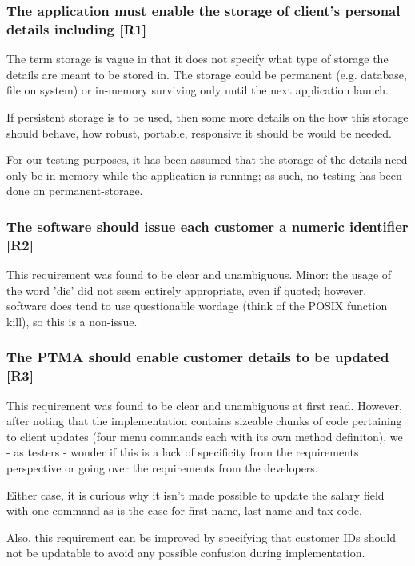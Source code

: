 \subsubsection{The application must enable the storage of client’s personal details including [R1]}
The term storage is vague in that it does not specify what type of storage the details are meant to be stored in. The storage could be permanent (e.g. database, file on system) or in-memory surviving only until the next application launch. 
\par
If persistent storage is to be used, then some more details on the how this storage should behave, how robust, portable, responsive it should be would be needed. 
\par
For our testing purposes, it has been assumed that the storage of the details need only be in-memory while the application is running; as such, no testing has been done on permanent-storage.

\subsubsection{The software should issue each customer a numeric identifier [R2]}
This requirement was found to be clear and unambiguous. 
Minor: the usage of the word 'die' did not seem entirely appropriate, even if quoted; however, software does tend to use questionable wordage (think of the POSIX function kill), so this is a non-issue.  

\subsubsection{The PTMA should enable customer details to be updated [R3]}
This requirement was found to be clear and unambiguous at first read. 
However, after noting that the implementation contains sizeable chunks of code pertaining to client updates (four menu commands each with its own method definiton), we - as testers - wonder if this is a lack of specificity from the requirements perspective or going over the requirements from the developers. 
\par
Either case, it is curious why it isn't made possible to update the salary field with one command as is the case for first-name, last-name and tax-code.  
\par
Also, this requirement can be improved by specifying that customer IDs should not be updatable to avoid any possible confusion during implementation. 

